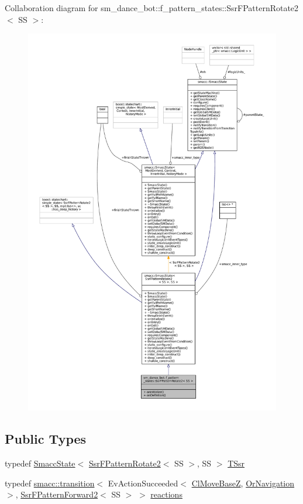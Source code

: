Collaboration diagram for sm\+\_\+dance\+\_\+bot\+:\+:f\+\_\+pattern\+\_\+states\+:\+:Ssr\+F\+Pattern\+Rotate2$<$ SS $>$\+:
\nopagebreak
\begin{figure}[H]
\begin{center}
\leavevmode
\includegraphics[width=350pt]{structsm__dance__bot_1_1f__pattern__states_1_1SsrFPatternRotate2__coll__graph}
\end{center}
\end{figure}
\subsection*{Public Types}
\begin{DoxyCompactItemize}
\item 
typedef \hyperlink{classSmaccState}{Smacc\+State}$<$ \hyperlink{structsm__dance__bot_1_1f__pattern__states_1_1SsrFPatternRotate2}{Ssr\+F\+Pattern\+Rotate2}$<$ SS $>$, SS $>$ \hyperlink{structsm__dance__bot_1_1f__pattern__states_1_1SsrFPatternRotate2_a88a56b5e255ad57b622ffc4f8c412fa0}{T\+Ssr}
\item 
typedef \hyperlink{classsmacc_1_1transition}{smacc\+::transition}$<$ Ev\+Action\+Succeeded$<$ \hyperlink{classmove__base__z__client_1_1ClMoveBaseZ}{Cl\+Move\+BaseZ}, \hyperlink{classsm__dance__bot_1_1OrNavigation}{Or\+Navigation} $>$, \hyperlink{structsm__dance__bot_1_1f__pattern__states_1_1SsrFPatternForward2}{Ssr\+F\+Pattern\+Forward2}$<$ SS $>$ $>$ \hyperlink{structsm__dance__bot_1_1f__pattern__states_1_1SsrFPatternRotate2_a60e1e60258a4a8fcc411e8045af9a7f7}{reactions}
\end{DoxyCompactItemize}
